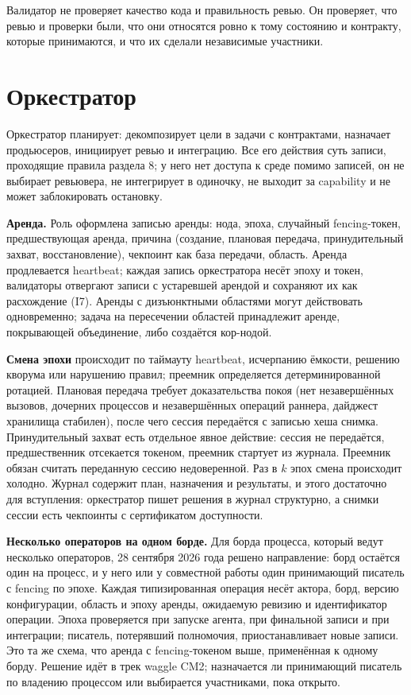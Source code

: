 \documentclass[11pt,a4paper]{article}
\begin{document}
Валидатор не проверяет качество кода и правильность ревью. Он проверяет, что ревью и проверки были, что они относятся ровно к тому состоянию и контракту, которые принимаются, и что их сделали независимые участники.

\section{Оркестратор}

Оркестратор планирует: декомпозирует цели в задачи с контрактами, назначает продьюсеров, инициирует ревью и интеграцию. Все его действия суть записи, проходящие правила раздела 8; у него нет доступа к среде помимо записей, он не выбирает ревьювера, не интегрирует в одиночку, не выходит за capability и не может заблокировать остановку.

\textbf{Аренда.} Роль оформлена записью аренды: нода, эпоха, случайный fencing-токен, предшествующая аренда, причина (создание, плановая передача, принудительный захват, восстановление), чекпоинт как база передачи, область. Аренда продлевается heartbeat; каждая запись оркестратора несёт эпоху и токен, валидаторы отвергают записи с устаревшей арендой и сохраняют их как расхождение (I7). Аренды с дизъюнктными областями могут действовать одновременно; задача на пересечении областей принадлежит аренде, покрывающей объединение, либо создаётся кор-нодой.

\textbf{Смена эпохи} происходит по таймауту heartbeat, исчерпанию ёмкости, решению кворума или нарушению правил; преемник определяется детерминированной ротацией. Плановая передача требует доказательства покоя (нет незавершённых вызовов, дочерних процессов и незавершённых операций раннера, дайджест хранилища стабилен), после чего сессия передаётся с записью хеша снимка. Принудительный захват есть отдельное явное действие: сессия не передаётся, предшественник отсекается токеном, преемник стартует из журнала. Преемник обязан считать переданную сессию недоверенной. Раз в $k$ эпох смена происходит холодно. Журнал содержит план, назначения и результаты, и этого достаточно для вступления: оркестратор пишет решения в журнал структурно, а снимки сессии есть чекпоинты с сертификатом доступности.

\textbf{Несколько операторов на одном борде.} Для борда процесса, который ведут несколько операторов, 28 сентября 2026 года решено направление: борд остаётся один на процесс, и у него или у совместной работы один принимающий писатель с fencing по эпохе. Каждая типизированная операция несёт актора, борд, версию конфигурации, область и эпоху аренды, ожидаемую ревизию и идентификатор операции. Эпоха проверяется при запуске агента, при финальной записи и при интеграции; писатель, потерявший полномочия, приостанавливает новые записи. Это та же схема, что аренда с fencing-токеном выше, применённая к одному борду. Решение идёт в трек waggle CM2; назначается ли принимающий писатель по владению процессом или выбирается участниками, пока открыто.
\end{document}
